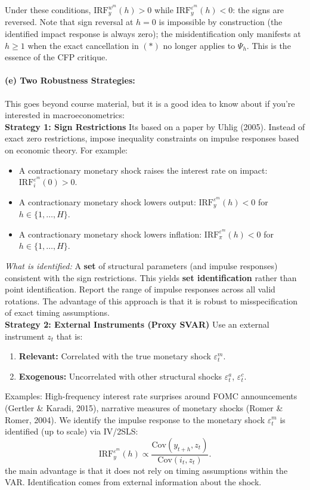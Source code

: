 \documentclass[12pt]{article}
\newcommand{\Cov}{\mathrm{Cov}}
\theoremstyle{definition}
\begin{document}
\noindent Under these conditions, $\text{IRF}_y^{w^m}(h)>0$ while $\text{IRF}_y^{\varepsilon^m}(h)<0$: the signs are reversed. Note that sign reversal at $h=0$ is impossible by construction (the identified impact response is always zero); the misidentification only manifests at $h\geq 1$ when the exact cancellation in $(*)$ no longer applies to $\Psi_h$. This is the essence of the CFP critique.

\bigskip
\paragraph{(e) Two Robustness Strategies:} This goes beyond course material, but it is a good idea to know about if you're interested in macroeconometrics: \\



\noindent \textbf{Strategy 1: Sign Restrictions} Its based on a paper by Uhlig (2005). Instead of exact zero restrictions, impose inequality constraints on impulse responses based on economic theory. For example:
\begin{itemize}
    \item A contractionary monetary shock raises the interest rate on impact: $\text{IRF}_i^{\varepsilon^m}(0) > 0$.
    \item A contractionary monetary shock lowers output: $\text{IRF}_y^{\varepsilon^m}(h) < 0$ for $h \in \{1, \ldots, H\}$.
    \item A contractionary monetary shock lowers inflation: $\text{IRF}_\pi^{\varepsilon^m}(h) < 0$ for $h \in \{1, \ldots, H\}$.
\end{itemize}

\noindent \textit{What is identified:} A \textbf{set} of structural parameters (and impulse responses) consistent with the sign restrictions. This yields \textbf{set identification} rather than point identification. Report the range of impulse responses across all valid rotations. The advantage of this approach is that it is robust to misspecification of exact timing assumptions. \\


\medskip
\noindent \textbf{Strategy 2: External Instruments (Proxy SVAR)} Use an external instrument $z_t$ that is:
\begin{enumerate}
    \item \textbf{Relevant:} Correlated with the true monetary shock $\varepsilon_t^m$.
    \item \textbf{Exogenous:} Uncorrelated with other structural shocks $\varepsilon_t^a$, $\varepsilon_t^c$.
\end{enumerate}
Examples: High-frequency interest rate surprises around FOMC announcements (Gertler \& Karadi, 2015), narrative measures of monetary shocks (Romer \& Romer, 2004). We identify the impulse response to the monetary shock $\varepsilon_t^m$ is identified (up to scale) via IV/2SLS:
\[
\text{IRF}_y^{\varepsilon^m}(h) \propto \frac{\Cov(y_{t+h}, z_t)}{\Cov(i_t, z_t)}.
\]
the main advantage is that it does not rely on timing assumptions within the VAR. Identification comes from external information about the shock.
\end{document}
